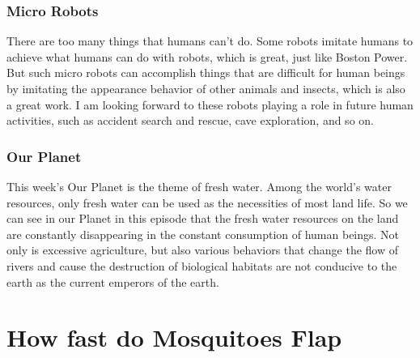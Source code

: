 \documentclass{article}
\begin{document}
\subsubsection*{Micro Robots}
There are too many things that humans can't do. Some robots imitate humans to achieve what humans can do with robots, which is great, just like Boston Power. But such micro robots can accomplish things that are difficult for human beings by imitating the appearance behavior of other animals and insects, which is also a great work. I am looking forward to these robots playing a role in future human activities, such as accident search and rescue, cave exploration, and so on.
\subsubsection*{Our Planet}
This week's Our Planet is the theme of fresh water. Among the world's water resources, only fresh water can be used as the necessities of most land life. So we can see in our Planet in this episode that the fresh water resources on the land are constantly disappearing in the constant consumption of human beings. Not only is excessive agriculture, but also various behaviors that change the flow of rivers and cause the destruction of biological habitats are not conducive to the earth as the current emperors of the earth.

\section{How fast do Mosquitoes Flap}
\end{document}
